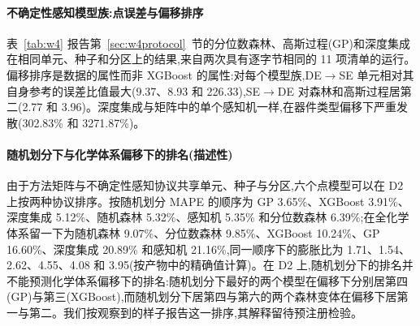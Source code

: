 \documentclass[11pt,a4paper]{ctexart}
\begin{document}
\begin{table}[t]
\centering\small
\caption{方法矩阵的事后度量稳健性(XGBoost;各重复的均值;不属于冻结协议)。中位 APE(MdAPE)与对称 MAPE(sMAPE,$100\cdot\mathrm{mean}\,|\hat d-d|/((|\hat d|+|d|)/2)$)以百分数给出;对数比误差为 $\log(\hat d/d)$ 的平均绝对值。比值是相对于同一数据集随机划分参考单元、在同一度量下计算的。}
\label{tab:w3robust}
\end{table}

\paragraph{不确定性感知模型族:点误差与偏移排序} 表~\ref{tab:w4} 报告第~\ref{sec:w4protocol}~节的分位数森林、高斯过程(GP)和深度集成在相同单元、种子和分区上的结果,来自两次具有逐字节相同的 11 项清单的运行。偏移排序是数据的属性而非 XGBoost 的属性:对每个模型族,DE$\to$SE 单元相对其自身参考的误差比值最大(9.37、8.93 和 226.33),SE$\to$DE 对森林和高斯过程居第二(2.77 和 3.96)。深度集成与矩阵中的单个感知机一样,在器件类型偏移下严重发散(302.83\% 和 3271.87\%)。

\paragraph{随机划分下与化学体系偏移下的排名(描述性)} 由于方法矩阵与不确定性感知协议共享单元、种子与分区,六个点模型可以在 D2 上按两种协议排序。按随机划分 MAPE 的顺序为 GP 3.65\%、XGBoost 3.91\%、深度集成 5.12\%、随机森林 5.32\%、感知机 5.35\% 和分位数森林 6.39\%;在全化学体系留一下为随机森林 9.07\%、分位数森林 9.85\%、XGBoost 10.24\%、GP 16.60\%、深度集成 20.89\% 和感知机 21.16\%,同一顺序下的膨胀比为 1.71、1.54、2.62、4.55、4.08 和 3.95(按产物中的精确值计算)。在 D2 上,随机划分下的排名并不能预测化学体系偏移下的排名:随机划分下最好的两个模型在偏移下分别居第四(GP)与第三(XGBoost),而随机划分下居第四与第六的两个森林变体在偏移下居第一与第二。我们按观察到的样子报告这一排序,其解释留待预注册检验。
\end{document}
